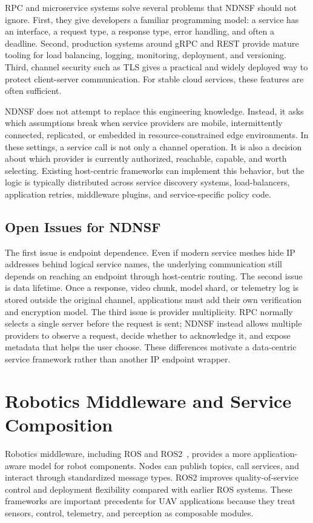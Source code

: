 RPC and microservice systems solve several problems that NDNSF should not
ignore. First, they give developers a familiar programming model: a service has
an interface, a request type, a response type, error handling, and often a
deadline. Second, production systems around gRPC and REST provide mature
tooling for load balancing, logging, monitoring, deployment, and versioning.
Third, channel security such as TLS gives a practical and widely deployed way
to protect client-server communication. For stable cloud services, these
features are often sufficient.

NDNSF does not attempt to replace this engineering knowledge. Instead, it asks
which assumptions break when service providers are mobile, intermittently
connected, replicated, or embedded in resource-constrained edge environments.
In these settings, a service call is not only a channel operation. It is also a
decision about which provider is currently authorized, reachable, capable, and
worth selecting. Existing host-centric frameworks can implement this behavior,
but the logic is typically distributed across service discovery systems,
load-balancers, application retries, middleware plugins, and service-specific
policy code.

\subsection{Open Issues for NDNSF}

The first issue is endpoint dependence. Even if modern service meshes hide IP
addresses behind logical service names, the underlying communication still
depends on reaching an endpoint through host-centric routing. The second issue
is data lifetime. Once a response, video chunk, model shard, or telemetry log is
stored outside the original channel, applications must add their own
verification and encryption model. The third issue is provider multiplicity.
RPC normally selects a single server before the request is sent; NDNSF instead
allows multiple providers to observe a request, decide whether to acknowledge
it, and expose metadata that helps the user choose. These differences motivate
a data-centric service framework rather than another IP endpoint wrapper.

\section{Robotics Middleware and Service Composition}

Robotics middleware, including ROS and ROS2~\cite{ros,ros2}, provides a more
application-aware model for robot components. Nodes can publish topics, call
services, and interact through standardized message types. ROS2 improves
quality-of-service control and deployment flexibility compared with earlier
ROS systems. These frameworks are important precedents for UAV applications
because they treat sensors, control, telemetry, and perception as composable
modules.


